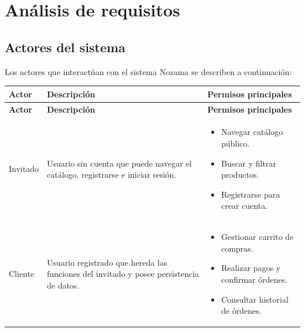 \documentclass[12pt,a4paper]{article}
\begin{document}
\section{Análisis de requisitos}


\subsection{Actores del sistema}
Los actores que interactúan con el sistema Nozama se describen a continuación:

\begin{longtable}{|l|p{7.5cm}|p{5.5cm}|}
    \hline
    \textbf{Actor}                                                                          & \textbf{Descripción} & \textbf{Permisos principales} \\ \hline
    \endfirsthead
    \hline
    \textbf{Actor}                                                                          & \textbf{Descripción} & \textbf{Permisos principales} \\ \hline
    \endhead

    Invitado                                                                                &
    Usuario sin cuenta que puede navegar el catálogo, registrarse e iniciar sesión.         &
    \begin{itemize}[leftmargin=*, nosep]
        \item Navegar catálogo público.
        \item Buscar y filtrar productos.
        \item Registrarse para crear cuenta.
    \end{itemize}                                                                                                        \\ \hline

    Cliente                                                                                 &
    Usuario registrado que hereda las funciones del invitado y posee persistencia de datos. &
    \begin{itemize}[leftmargin=*, nosep]
        \item Gestionar carrito de compras.
        \item Realizar pagos y confirmar órdenes.
        \item Consultar historial de órdenes.
    \end{itemize}                                                                                                   \\ \hline


\end{longtable}
\end{document}
